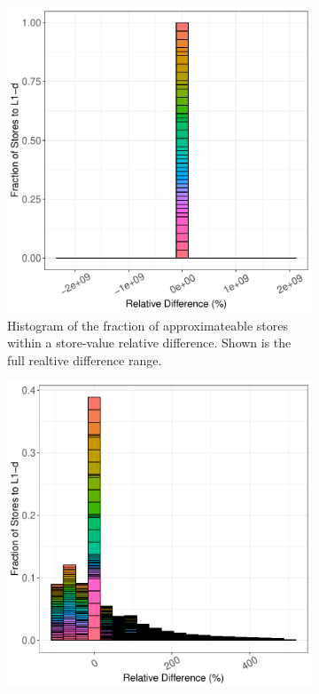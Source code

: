 \begin{figure}[htbp]
	\begin{subfigure}{0.33\textwidth}
		\centering
		\includegraphics[scale=0.4]{graphs/linear_regression/full_hist.pdf}
		\caption{Histogram of the fraction of approximateable stores within a store-value relative difference. Shown is the full realtive difference range.}
	\end{subfigure}
	\begin{subfigure}{0.33\textwidth}
		\centering
		\includegraphics[scale=0.4]{graphs/linear_regression/narrow_hist.pdf}

\end{subfigure}
\end{figure}
